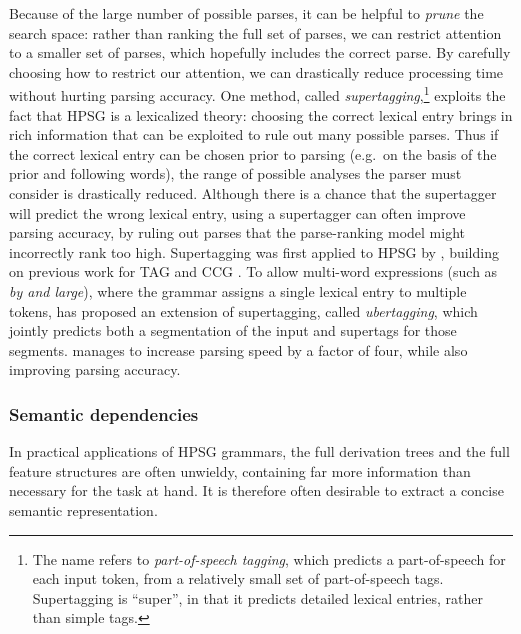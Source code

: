 \documentclass[output=paper,nonflat]{langsci/langscibook}
\begin{document}
Because of the large number of possible parses,
it can be helpful to \textit{prune} the search space:
rather than ranking the full set of parses,
we can restrict attention to a smaller set of parses,
which hopefully includes the correct parse.
By carefully choosing how to restrict our attention,
we can drastically reduce processing time without hurting parsing accuracy.
One method, called \textit{supertagging},\footnote{%
	The name refers to \textit{part-of-speech tagging},
	which predicts a part-of-speech for each input token,
	from a relatively small set of part-of-speech tags.
	Supertagging is ``super'', in that it predicts detailed lexical entries, rather than simple tags.
}
exploits the fact that HPSG is a lexicalized theory:
choosing the correct lexical entry brings in rich information
that can be exploited to rule out many possible parses.
Thus if the correct lexical entry can be chosen prior to parsing
(e.g.\ on the basis of the prior and following words),
the range of possible analyses the parser must consider is drastically reduced.
Although there is a chance that the supertagger will predict the wrong lexical entry,
using a supertagger can often improve parsing accuracy,
by ruling out parses that the parse-ranking model might incorrectly rank too high.
Supertagging was first applied to HPSG by \citet{matsuzaki2007supertag},
building on previous work for TAG \citep{bangalore1999supertag}
and CCG \citep{clark2004supertag}.
To allow multi-word expressions (such as \textit{by and large}),
where the grammar assigns a single lexical entry to multiple tokens,
\citet{dridan2013ubertag} has proposed an extension of supertagging, called \textit{ubertagging},
which jointly predicts both a segmentation of the input and supertags for those segments.
\citeauthor{dridan2013ubertag} manages to increase parsing speed by a factor of four,
while also improving parsing accuracy.


\subsubsection{Semantic dependencies}
\label{cl:prac:dep}

In practical applications of HPSG grammars,
the full derivation trees and the full feature structures are often unwieldy,
containing far more information than necessary for the task at hand.
It is therefore often desirable to extract a concise semantic representation.
\end{document}
